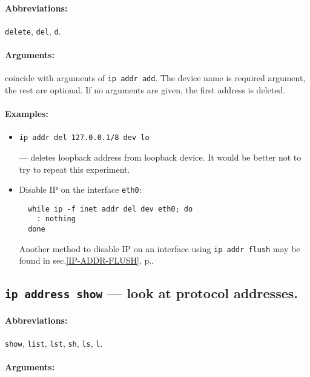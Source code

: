 \paragraph{Abbreviations:} \verb|delete|, \verb|del|, \verb|d|.

\paragraph{Arguments:} coincide with arguments of \verb|ip addr add|.
The device name is required argument, the rest are optional.
If no arguments are given, the first address is deleted.

\paragraph{Examples:}
\begin{itemize}
\item \verb|ip addr del 127.0.0.1/8 dev lo|

--- deletes loopback address from loopback device.
It would be better not to try to repeat this experiment.

\item Disable IP on the interface \verb|eth0|:
\begin{verbatim}
  while ip -f inet addr del dev eth0; do
    : nothing
  done
\end{verbatim}
Another method to disable IP on an interface using {\tt ip addr flush}
may be found in sec.\ref{IP-ADDR-FLUSH}, p.\pageref{IP-ADDR-FLUSH}.

\end{itemize}


\subsection{{\tt ip address show} --- look at protocol addresses.}

\paragraph{Abbreviations:} \verb|show|, \verb|list|, \verb|lst|, \verb|sh|, \verb|ls|,
\verb|l|.

\paragraph{Arguments:}

